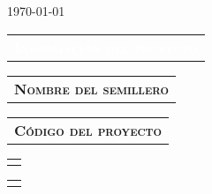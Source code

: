 \documentclass[12pt]{report}
\newcommand\tope{100}
\begin{document}
\begin{center}
	\today
\end{center}

\vspace{0.1 cm}


\ifthenelse{\advances < \tope}{\mypageT{\solution}{\advances}}{\mypageO}

\vspace{0.3 cm}

\begin{minipage}{\textwidth}
	\begin{tabular}{l}
		\begin{minipage}[t]{0.5\textwidth}%
			\cellcolor{blue!70}\textcolor{white}{\textsc{\textbf{Información del proyecto}}}
		\end{minipage}
	\end{tabular}	
\end{minipage}

\begin{minipage}{\textwidth}
	\begin{tabular}{l}
		\begin{minipage}[t]{0.7\textwidth}%
			\cellcolor{blue!10}\textsc{\textbf{Nombre del semillero}}
		\end{minipage}
	\end{tabular}	
	\begin{tabular}{l}
		\begin{minipage}[t]{0.28\textwidth}%
			\centering
			\cellcolor{blue!10}\textsc{\textbf{Código del proyecto}}
		\end{minipage}
	\end{tabular}	
\end{minipage}

\begin{minipage}{\textwidth}
	\begin{tabular}{l}
		\begin{minipage}[t]{0.7\textwidth}%
			\cellcolor{white!10}{\hotbed}
		\end{minipage}
	\end{tabular}	
	\begin{tabular}{c}
		\begin{minipage}[t]{0.28\textwidth}
			\centering
			\cellcolor{white!10}\textbf{\code}
		\end{minipage}
	\end{tabular}	
\end{minipage}
\end{document}
